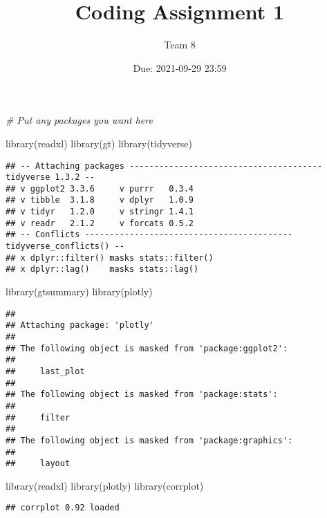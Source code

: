 \documentclass[
]{article}
\title{Coding Assignment 1}
\author{Team 8}
\date{Due: 2021-09-29 23:59}
\newenvironment{Shaded}{\begin{snugshade}}{\end{snugshade}}
\newcommand{\CommentTok}[1]{\textcolor[rgb]{0.56,0.35,0.01}{\textit{#1}}}
\newcommand{\FunctionTok}[1]{\textcolor[rgb]{0.00,0.00,0.00}{#1}}
\newcommand{\NormalTok}[1]{#1}
\begin{document}
\maketitle

{
\setcounter{tocdepth}{2}
\tableofcontents
}
\begin{Shaded}
\begin{Highlighting}[]
\CommentTok{\# Put any packages you want here}

\FunctionTok{library}\NormalTok{(readxl)}
\FunctionTok{library}\NormalTok{(gt)}
\FunctionTok{library}\NormalTok{(tidyverse)}
\end{Highlighting}
\end{Shaded}

\begin{verbatim}
## -- Attaching packages --------------------------------------- tidyverse 1.3.2 --
## v ggplot2 3.3.6     v purrr   0.3.4
## v tibble  3.1.8     v dplyr   1.0.9
## v tidyr   1.2.0     v stringr 1.4.1
## v readr   2.1.2     v forcats 0.5.2
## -- Conflicts ------------------------------------------ tidyverse_conflicts() --
## x dplyr::filter() masks stats::filter()
## x dplyr::lag()    masks stats::lag()
\end{verbatim}

\begin{Shaded}
\begin{Highlighting}[]
\FunctionTok{library}\NormalTok{(gtsummary)}
\FunctionTok{library}\NormalTok{(plotly)}
\end{Highlighting}
\end{Shaded}

\begin{verbatim}
## 
## Attaching package: 'plotly'
## 
## The following object is masked from 'package:ggplot2':
## 
##     last_plot
## 
## The following object is masked from 'package:stats':
## 
##     filter
## 
## The following object is masked from 'package:graphics':
## 
##     layout
\end{verbatim}

\begin{Shaded}
\begin{Highlighting}[]
\FunctionTok{library}\NormalTok{(readxl)}
\FunctionTok{library}\NormalTok{(plotly)}
\FunctionTok{library}\NormalTok{(corrplot)}
\end{Highlighting}
\end{Shaded}

\begin{verbatim}
## corrplot 0.92 loaded
\end{verbatim}
\end{document}

